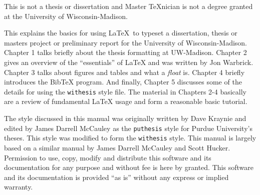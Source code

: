 %
%
%

\noindent       %
This is not a thesis or dissertation and Master \TeX nician is not a
degree granted at the University of Wisconsin-Madison.

\vspace*{0.5em}
\noindent       %
This explains the basics for using \LaTeX\ to typeset a dissertation,
thesis or masters project or preliminary report for the University of 
Wisconsin-Madison. Chapter
1 talks briefly about the thesis formatting at UW-Madison.  Chapter 2 gives
an overview of the ``essentials'' of \LaTeX{} and was written by Jon Warbrick.
Chapter 3 talks about figures and tables and what a {\em float} is.  Chapter 4
briefly introduces the {\sc Bib}\TeX{} program.  And finally, Chapter 5 discusses
some of the details for using the {\tt withesis} style file.  The material in
Chapters 2-4 basically are a review of fundamental \LaTeX{} usage and form
a reasonable basic tutorial.

\vspace*{0.5em}
\noindent       %
The style discussed in this manual was originally written by Dave Kraynie and
edited by James Darrell McCauley as the {\tt puthesis} style for Purdue
University's theses.  This style was modified to form the {\tt withesis} style. This
manual is largely based on a similar manual by James Darrell McCauley and Scott Hucker.
Permission to use, copy, modify and distribute this software and its documentation
for any purpose and without fee is here by granted.  This software and its documentation
is provided ``as is'' without any express or implied warranty.
